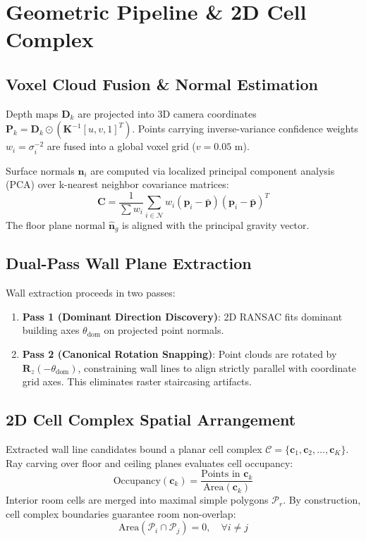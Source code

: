 \documentclass[10pt,twocolumn,a4paper]{article}
\begin{document}
\section{Geometric Pipeline \& 2D Cell Complex}

\subsection{Voxel Cloud Fusion \& Normal Estimation}
Depth maps $\mathbf{D}_k$ are projected into 3D camera coordinates $\mathbf{P}_k = \mathbf{D}_k \odot (\mathbf{K}^{-1} [u, v, 1]^T)$. Points carrying inverse-variance confidence weights $w_i = \sigma_i^{-2}$ are fused into a global voxel grid ($v = 0.05\text{ m}$).

Surface normals $\mathbf{n}_i$ are computed via localized principal component analysis (PCA) over k-nearest neighbor covariance matrices:
\begin{equation}
\mathbf{C} = \frac{1}{\sum w_i} \sum_{i \in \mathcal{N}} w_i (\mathbf{p}_i - \bar{\mathbf{p}})(\mathbf{p}_i - \bar{\mathbf{p}})^T
\end{equation}
The floor plane normal $\hat{\mathbf{n}}_g$ is aligned with the principal gravity vector.

\subsection{Dual-Pass Wall Plane Extraction}
Wall extraction proceeds in two passes:
\begin{enumerate}[leftmargin=*]
    \item \textbf{Pass 1 (Dominant Direction Discovery)}: 2D RANSAC fits dominant building axes $\theta_{\text{dom}}$ on projected point normals.
    \item \textbf{Pass 2 (Canonical Rotation Snapping)}: Point clouds are rotated by $\mathbf{R}_z(-\theta_{\text{dom}})$, constraining wall lines to align strictly parallel with coordinate grid axes. This eliminates raster staircasing artifacts.
\end{enumerate}

\subsection{2D Cell Complex Spatial Arrangement}
Extracted wall line candidates bound a planar cell complex $\mathcal{C} = \{\mathbf{c}_1, \mathbf{c}_2, \dots, \mathbf{c}_K\}$. Ray carving over floor and ceiling planes evaluates cell occupancy:
\begin{equation}
\text{Occupancy}(\mathbf{c}_k) = \frac{\text{Points in } \mathbf{c}_k}{\text{Area}(\mathbf{c}_k)}
\end{equation}
Interior room cells are merged into maximal simple polygons $\mathcal{P}_r$. By construction, cell complex boundaries guarantee room non-overlap:
\begin{equation}
\mathrm{Area}(\mathcal{P}_i \cap \mathcal{P}_j) = 0, \quad \forall i \neq j
\end{equation}
\end{document}
